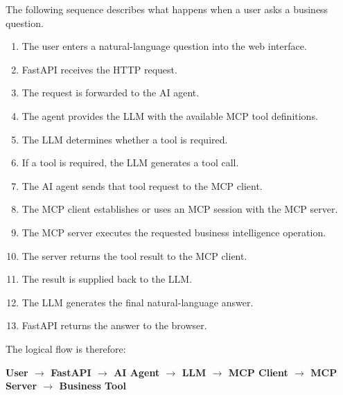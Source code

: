 \documentclass[11pt,a4paper]{article}
\begin{document}
The following sequence describes what happens when a user asks a
business question.

\begin{enumerate}

\item The user enters a natural-language question into the web interface.

\item FastAPI receives the HTTP request.

\item The request is forwarded to the AI agent.

\item The agent provides the LLM with the available MCP tool definitions.

\item The LLM determines whether a tool is required.

\item If a tool is required, the LLM generates a tool call.

\item The AI agent sends that tool request to the MCP client.

\item The MCP client establishes or uses an MCP session with the MCP
server.

\item The MCP server executes the requested business intelligence
operation.

\item The server returns the tool result to the MCP client.

\item The result is supplied back to the LLM.

\item The LLM generates the final natural-language answer.

\item FastAPI returns the answer to the browser.

\end{enumerate}

The logical flow is therefore:

\begin{center}

\textbf{
User
$\rightarrow$
FastAPI
$\rightarrow$
AI Agent
$\rightarrow$
LLM
$\rightarrow$
MCP Client
$\rightarrow$
MCP Server
$\rightarrow$
Business Tool
}

\end{center}
\end{document}
